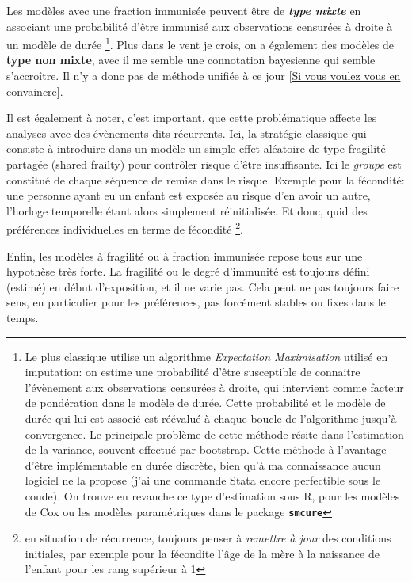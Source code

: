 \documentclass[
  12pt,
  letterpaper,
  DIV=11,
  numbers=noendperiod,
  onepage,
  openany]{scrreprt}
\begin{document}
Les modèles avec une fraction immunisée peuvent être de
\textbf{\emph{type mixte}} en associant une probabilité d'être immunisé
aux observations censurées à droite à un modèle de durée \footnote{Le
  plus classique utilise un algorithme \emph{Expectation Maximisation}
  utilisé en imputation: on estime une probabilité d'être susceptible de
  connaitre l'évènement aux observations censurées à droite, qui
  intervient comme facteur de pondération dans le modèle de durée. Cette
  probabilité et le modèle de durée qui lui est associé est réévalué à
  chaque boucle de l'algorithme jusqu'à convergence. Le principale
  problème de cette méthode résite dans l'estimation de la variance,
  souvent effectué par bootstrap. Cette méthode à l'avantage d'être
  implémentable en durée discrète, bien qu'à ma connaissance aucun
  logiciel ne la propose (j'ai une commande Stata encore perfectible
  sous le coude). On trouve en revanche ce type d'estimation sous R,
  pour les modèles de Cox ou les modèles paramétriques dans le package
  \textbf{\texttt{smcure}}}. Plus dans le vent je crois, on a également
des modèles de \textbf{type non mixte}, avec il me semble une
connotation bayesienne qui semble s'accroître. Il n'y a donc pas de
méthode unifiée à ce jour
{[}\href{https://www.annualreviews.org/doi/10.1146/annurev-statistics-031017-100101}{Si
vous voulez vous en convaincre}{]}.

Il est également à noter, c'est important, que cette problématique
affecte les analyses avec des évènements dits récurrents. Ici, la
stratégie classique qui consiste à introduire dans un modèle un simple
effet aléatoire de type fragilité partagée (shared frailty) pour
contrôler risque d'être insuffisante. Ici le \emph{groupe} est constitué
de chaque séquence de remise dans le risque. Exemple pour la fécondité:
une personne ayant eu un enfant est exposée au risque d'en avoir un
autre, l'horloge temporelle étant alors simplement réinitialisée. Et
donc, quid des préférences individuelles en terme de fécondité
\footnote{en situation de récurrence, toujours penser à \emph{remettre à
  jour} des conditions initiales, par exemple pour la fécondite l'âge de
  la mère à la naissance de l'enfant pour les rang supérieur à 1}.

Enfin, les modèles à fragilité ou à fraction immunisée repose tous sur
une hypothèse très forte. La fragilité ou le degré d'immunité est
toujours défini (estimé) en début d'exposition, et il ne varie pas. Cela
peut ne pas toujours faire sens, en particulier pour les préférences,
pas forcément stables ou fixes dans le temps.
\end{document}
